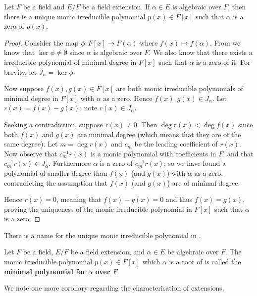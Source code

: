 \begin{corollary}\label{corollary-unique-minimal-polynomial}
    Let $F$ be a field and $E/F$ be a field extension. If $\alpha \in E$ is algebraic over $F$, then there is a unique monic irreducible polynomial $p(x) \in F[x]$ such that $\alpha$ is a zero of $p(x)$.
\end{corollary}
\begin{proof}
    Consider the map $\phi: F[x] \to F(\alpha)$ where $f(x) \mapsto f(\alpha)$. From  we know that $\ker\phi \neq \emptyset$ since $\alpha$ is algebraic over $F$. We also know that there exists a irreducible polynomial of minimal degree in $F[x]$ such that $\alpha$ is a zero of it. For brevity, let $J_\alpha = \ker\phi$.

    Now suppose $f(x), g(x) \in F[x]$ are both monic irreducible polynomials of minimal degree in $F[x]$ with $\alpha$ as a zero. Hence $f(x), g(x) \in J_\alpha$. Let $r(x) = f(x) - g(x)$; note $r(x) \in J_\alpha$.

    Seeking a contradiction, suppose $r(x) \neq 0$. Then $\deg r(x) < \deg f(x)$ since both $f(x)$ and $g(x)$ are minimal degree (which means that they are of the same degree). Let $m = \deg r(x)$ and $c_m$ be the leading coefficient of $r(x)$. Now observe that $c_m^{-1}r(x)$ is a monic polynomial with coefficients in $F$, and that $c_m^{-1}r(x) \in J_\alpha$. Furthermore $\alpha$ is a zero of $c_m^{-1}r(x)$; so we have found a polynomial of smaller degree than $f(x)$ (and $g(x)$) with $\alpha$ as a zero, contradicting the assumption that $f(x)$ (and $g(x)$) are of minimal degree.

    Hence $r(x) = 0$, meaning that $f(x) - g(x) = 0$ and thus $f(x) = g(x)$, proving the uniqueness of the monic irreducible polynomial in $F[x]$ such that $\alpha$ is a zero.
\end{proof}

There is a name for the unique monic irreducible polynomial in .

\begin{definition}
    Let $F$ be a field, $E/F$ be a field extension, and $\alpha \in E$ be algebraic over $F$. The monic irreducible polynomial $p(x) \in F[x]$ which $\alpha$ is a root of is called the \textbf{minimal polynomial for $\alpha$ over $F$}.
\end{definition}

We note one more corollary regarding the characterisation of extensions.

